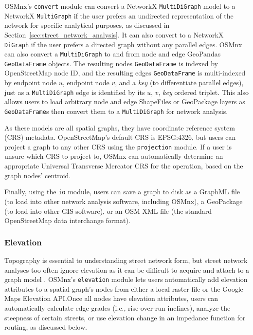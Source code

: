 \documentclass[12pt,letterpaper]{article} %
\begin{document}
OSMnx's \texttt{convert} module can convert a NetworkX \texttt{MultiDiGraph} model to a NetworkX \texttt{MultiGraph} if the user prefers an undirected representation of the network for specific analytical purposes, as discussed in Section~\ref{sec:street_network_analysis}. It can also convert to a NetworkX \texttt{DiGraph} if the user prefers a directed graph without any parallel edges. OSMnx can also convert a \texttt{MultiDiGraph} to and from node and edge GeoPandas \texttt{GeoDataFrame} objects. The resulting nodes \texttt{GeoDataFrame} is indexed by OpenStreetMap node ID, and the resulting edges \texttt{GeoDataFrame} is multi-indexed by endpoint node $u$, endpoint node $v$, and a \textit{key} (to differentiate parallel edges), just as a \texttt{MultiDiGraph} edge is identified by its $u$, $v$, \textit{key} ordered triplet. This also allows users to load arbitrary node and edge ShapeFiles or GeoPackage layers as \texttt{GeoDataFrame}s then convert them to a \texttt{MultiDiGraph} for network analysis.

As these models are all spatial graphs, they have coordinate reference system (CRS) metadata. OpenStreetMap's default CRS is EPSG:4326, but users can project a graph to any other CRS using the \texttt{projection} module. If a user is unsure which CRS to project to, OSMnx can automatically determine an appropriate Universal Transverse Mercator CRS for the operation, based on the graph nodes' centroid.

Finally, using the \texttt{io} module, users can save a graph to disk as a GraphML file (to load into other network analysis software, including OSMnx), a GeoPackage (to load into other GIS software), or an OSM XML file (the standard OpenStreetMap data interchange format).

\subsubsection{Elevation}

Topography is essential to understanding street network form, but street network analyses too often ignore elevation as it can be difficult to acquire and attach to a graph model \citep{boeing_street_2022}. OSMnx's \texttt{elevation} module lets users automatically add elevation attributes to a spatial graph's nodes from either a local raster file or the Google Maps Elevation API.\@ Once all nodes have elevation attributes, users can automatically calculate edge grades (i.e., rise-over-run inclines), analyze the steepness of certain streets, or use elevation change in an impedance function for routing, as discussed below.
\end{document}
